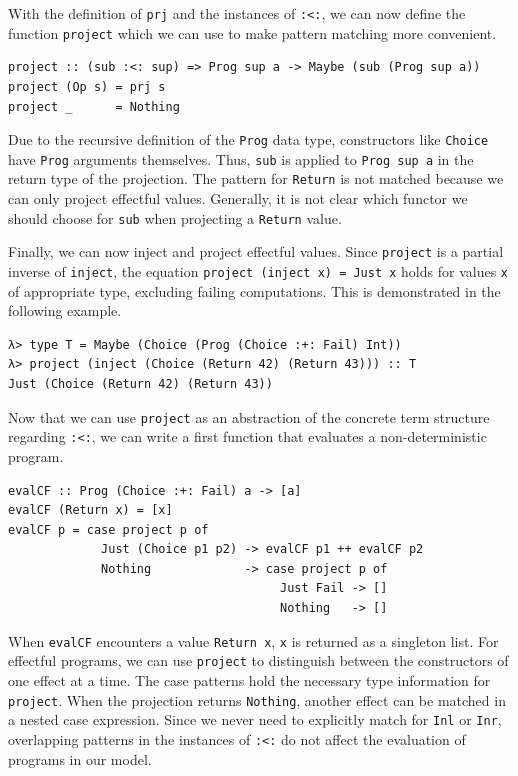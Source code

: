\documentclass[a4paper, 11pt, fleqn, twoside, abstract=on]{scrreprt}
\newcommand{\hinl}[1]{\texttt{#1}}
\newcommand{\cinl}[1]{\texttt{#1}}
\begin{document}
With the definition of \hinl{prj} and the instances of \hinl{:<:}, we can now define the function \hinl{project} which we can use to make pattern matching more convenient.

\begin{verbatim}
project :: (sub :<: sup) => Prog sup a -> Maybe (sub (Prog sup a))
project (Op s) = prj s
project _      = Nothing
\end{verbatim}

Due to the recursive definition of the \hinl{Prog} data type, constructors like \hinl{Choice} have \hinl{Prog} arguments themselves.
Thus, \hinl{sub} is applied to \hinl{Prog sup a} in the return type of the projection.
The pattern for \cinl{Return} is not matched because we can only project effectful values.
Generally, it is not clear which functor we should choose for \hinl{sub} when projecting a \hinl{Return} value.

Finally, we can now inject and project effectful values.
Since \hinl{project} is a partial inverse of \hinl{inject}, the equation \hinl{project (inject x) = Just x} holds for values \hinl{x} of appropriate type, excluding failing computations.
This is demonstrated in the following example.

\begin{verbatim}
λ> type T = Maybe (Choice (Prog (Choice :+: Fail) Int))
λ> project (inject (Choice (Return 42) (Return 43))) :: T
Just (Choice (Return 42) (Return 43))
\end{verbatim}

Now that we can use \hinl{project} as an abstraction of the concrete term structure regarding \hinl{:<:}, we can write a first function that evaluates a non-deterministic program.

\begin{verbatim}
evalCF :: Prog (Choice :+: Fail) a -> [a]
evalCF (Return x) = [x]
evalCF p = case project p of
             Just (Choice p1 p2) -> evalCF p1 ++ evalCF p2
             Nothing             -> case project p of
                                      Just Fail -> []
                                      Nothing   -> []
\end{verbatim}

When \hinl{evalCF} encounters a value \hinl{Return x}, \hinl{x} is returned as a singleton list.
For effectful programs, we can use \hinl{project} to distinguish between the constructors of one effect at a time.
The case patterns hold the necessary type information for \hinl{project}.
When the projection returns \hinl{Nothing}, another effect can be matched in a nested case expression.
Since we never need to explicitly match for \hinl{Inl} or \hinl{Inr}, overlapping patterns in the instances of \hinl{:<:} do not affect the evaluation of programs in our model.
\end{document}
